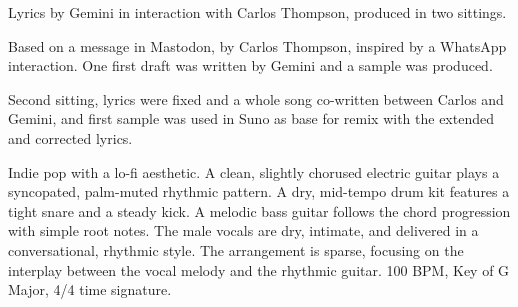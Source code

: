 

\begin{notes}
Lyrics by Gemini in interaction with Carlos Thompson, produced in two sittings.

Based on a message in Mastodon, by Carlos Thompson, inspired by a WhatsApp interaction. %
One first draft was written by Gemini and a sample was produced.

Second sitting, lyrics were fixed and a whole song co-written between Carlos and Gemini, and first sample was used in Suno as base for remix with the extended and corrected lyrics.
\end{notes}

\begin{style}
Indie pop with a lo-fi aesthetic. %
A clean, slightly chorused electric guitar plays a syncopated, palm-muted rhythmic pattern. %
A dry, mid-tempo drum kit features a tight snare and a steady kick. %
A melodic bass guitar follows the chord progression with simple root notes. %
The male vocals are dry, intimate, and delivered in a conversational, rhythmic style. %
The arrangement is sparse, focusing on the interplay between the vocal melody and the rhythmic guitar. %
100 BPM, Key of G Major, 4/4 time signature.
\end{style}

